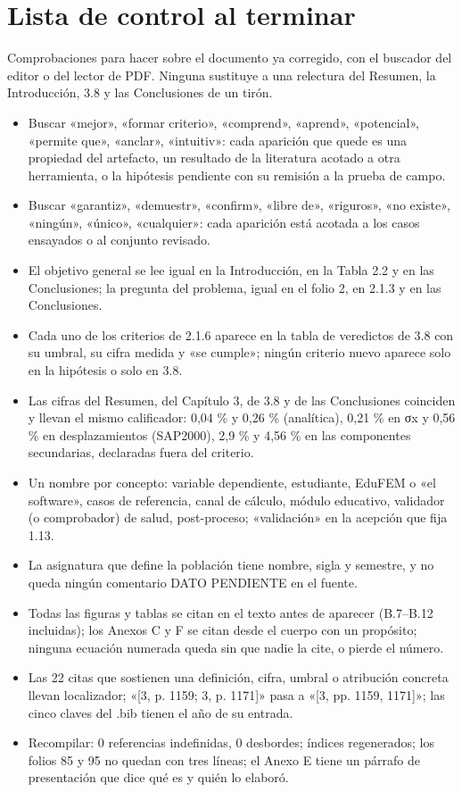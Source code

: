 \section{Lista de control al terminar}
Comprobaciones para hacer sobre el documento ya corregido, con el buscador del editor o del lector de PDF. Ninguna sustituye a una relectura del Resumen, la Introducción, 3.8 y las Conclusiones de un tirón.
\begin{itemize}[label={\casilla},leftmargin=1.8em,itemsep=3pt]
\item Buscar «mejor», «formar criterio», «comprend», «aprend», «potencial», «permite que», «anclar», «intuitiv»: cada aparición que quede es una propiedad del artefacto, un resultado de la literatura acotado a otra herramienta, o la hipótesis pendiente con su remisión a la prueba de campo.
\item Buscar «garantiz», «demuestr», «confirm», «libre de», «riguros», «no existe», «ningún», «único», «cualquier»: cada aparición está acotada a los casos ensayados o al conjunto revisado.
\item El objetivo general se lee igual en la Introducción, en la Tabla 2.2 y en las Conclusiones; la pregunta del problema, igual en el folio 2, en 2.1.3 y en las Conclusiones.
\item Cada uno de los criterios de 2.1.6 aparece en la tabla de veredictos de 3.8 con su umbral, su cifra medida y «se cumple»; ningún criterio nuevo aparece solo en la hipótesis o solo en 3.8.
\item Las cifras del Resumen, del Capítulo 3, de 3.8 y de las Conclusiones coinciden y llevan el mismo calificador: 0,04 \% y 0,26 \% (analítica), 0,21 \% en σx y 0,56 \% en desplazamientos (SAP2000), 2,9 \% y 4,56 \% en las componentes secundarias, declaradas fuera del criterio.
\item Un nombre por concepto: variable dependiente, estudiante, EduFEM o «el software», casos de referencia, canal de cálculo, módulo educativo, validador (o comprobador) de salud, post-proceso; «validación» en la acepción que fija 1.13.
\item La asignatura que define la población tiene nombre, sigla y semestre, y no queda ningún comentario DATO PENDIENTE en el fuente.
\item Todas las figuras y tablas se citan en el texto antes de aparecer (B.7–B.12 incluidas); los Anexos C y F se citan desde el cuerpo con un propósito; ninguna ecuación numerada queda sin que nadie la cite, o pierde el número.
\item Las 22 citas que sostienen una definición, cifra, umbral o atribución concreta llevan localizador; «[3, p. 1159; 3, p. 1171]\allowbreak{}» pasa a «[3, pp. 1159, 1171]\allowbreak{}»; las cinco claves del .bib tienen el año de su entrada.
\item Recompilar: 0 referencias indefinidas, 0 desbordes; índices regenerados; los folios 85 y 95 no quedan con tres líneas; el Anexo E tiene un párrafo de presentación que dice qué es y quién lo elaboró.
\end{itemize}
